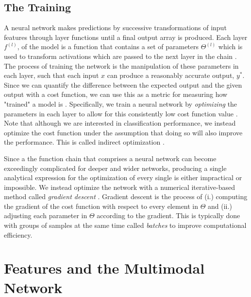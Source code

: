 \documentclass[conference,twocolumn,letterpaper]{IEEEtran}
\begin{document}

\subsection{The Training}
\label{subsec:CostFunction}

A neural network makes predictions by successive transformations of input features through layer functions until a final output array is produced. Each layer $f^(l)$, of the model is a function that contains a set of parameters $\Theta^{(l)}$ which is used to transform activations which are passed to the next layer in the chain \cite{Goodfellow}. The process of training the network is the manipulation of these parameters in each layer, such that each input $x$ can produce a reasonably accurate output, $y^*$. Since we can quantify the difference between the expected output and the given output with a cost function, we can use this as a metric for measuring how "trained" a model is \cite{James}. Specifically, we train a neural network by \textit{optimizing} the parameters in each layer to allow for this consistently low cost function value \cite{Geron}. Note that although we are interested in classification performance, we instead optimize the cost function under the assumption that doing so will also improve the performance. This is called indirect optimization \cite{Goodfellow}.

Since a the function chain that comprises a neural network can become exceedingly complicated for deeper and wider networks, producing a single analytical expression for the optimization of every single is either impractical or impossible. We instead optimize the network with a numerical iterative-based method called \textit{gradient descent} \cite{Geron,Goodfellow}. Gradient descent is the process of (i.) computing the gradient of the cost function with respect to every element in $\Theta$ and (ii.) adjusting each parameter in $\Theta$ according to the gradient. This is typically done with groups of samples at the same time called \textit{batches} to improve computational efficiency. 


\section{Features and the Multimodal Network}
\label{sec:Features}
\end{document}
